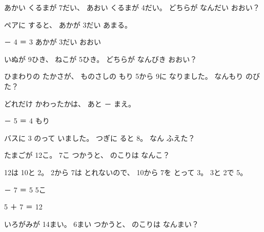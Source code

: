 \begin{reidai}[ちがい]
あかい くるまが 7だい、 あおい くるまが 4だい。 どちらが なんだい おおい？
\begin{bkfigure}
\end{bkfigure}
\kangaekata ペアに すると、 あかが 3だい あまる。

 － 4 ＝ 3 \kotaenext あかが 3だい おおい
\end{reidai}

\begin{jibun}
いぬが 9ひき、 ねこが 5ひき。 どちらが なんびき おおい？
\bkshikiran[11\zw]
\end{jibun}

\begin{reidai}
ひまわりの たかさが、 ものさしの もり 5から 9に なりました。 なんもり のびた？

\kangaekata どれだけ かわったかは、 あと － まえ。

 － 5 ＝ 4 もり
\end{reidai}

\begin{jibun}
バスに 3 のって いました。 つぎに ると 8。 なん ふえた？
\bkshikiran
{}
\end{jibun}

\begin{reidai}
たまごが 12こ。 7こ つかうと、 のこりは なんこ？

\kangaekata 12は 10と 2。 2から 7は とれないので、 10から 7を とって 3。 3と 2で 5。

 － 7 ＝ 5 \kotaenext 5こ

5 ＋ 7 ＝ 12
\end{reidai}

\begin{jibun}
いろがみが 14まい。 6まい つかうと、 のこりは なんまい？
\bkshikiran
{}
\end{jibun}

